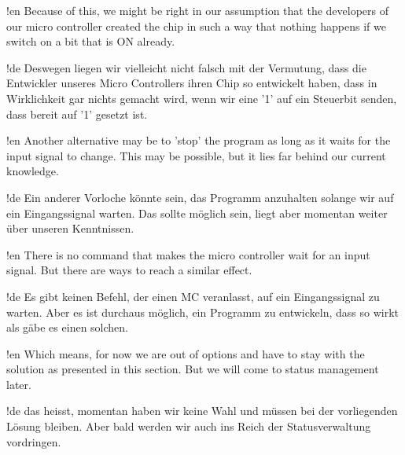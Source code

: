 !en Because of this, we might be right in our assumption that the developers of our \at micro controller created the chip in such a way that nothing happens if we switch on a bit that is ON already.

!de Deswegen liegen wir vielleicht nicht falsch mit der Vermutung, dass die Entwickler unseres \at Micro Controllers ihren Chip so entwickelt haben, dass in Wirklichkeit gar nichts gemacht wird, wenn wir eine '1' auf ein Steuerbit senden, dass bereit auf '1' gesetzt ist.



!en Another alternative may be to 'stop' the program as long as it waits for the input signal to change. This may be possible, but it lies far behind our current knowledge.

!de Ein anderer Vorloche könnte sein, das Programm anzuhalten solange wir auf ein Eingangssignal warten. Das sollte möglich sein, liegt aber momentan weiter über unseren Kenntnissen.



!en There is no command that makes the micro controller wait for an input signal. But there are ways to reach a similar effect.

!de Es gibt keinen Befehl, der einen MC veranlasst, auf ein Eingangssignal zu warten. Aber es ist durchaus möglich, ein Programm zu entwickeln, dass so wirkt als gäbe es einen solchen.



!en Which means, for now we are out of options and have to stay with the solution as presented in this section. But we will come to status management later.

!de das heisst, momentan haben wir keine Wahl und müssen bei der vorliegenden Lösung bleiben. Aber bald werden wir auch ins Reich der Statusverwaltung vordringen.
